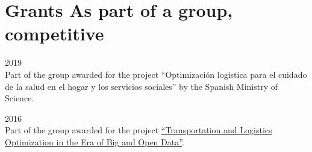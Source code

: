 \section*{Grants \small{As part of a group, competitive}}

\begin{paracol}{2}
  \textsc{2019}
\switchcolumn
  \\
  Part of the group awarded for the project ``Optimización logistica para el cuidado de la salud en el hogar y los servicios sociales'' by the Spanish Ministry of Science.
\end{paracol}

\begin{paracol}{2}
  \textsc{2016}
\switchcolumn
  \\
  Part of the group awarded for the project \href{https://santini.in/files/cv/prin16.pdf}{``Transportation and Logistics Optimization in the Era of Big and Open Data''}.
\end{paracol}